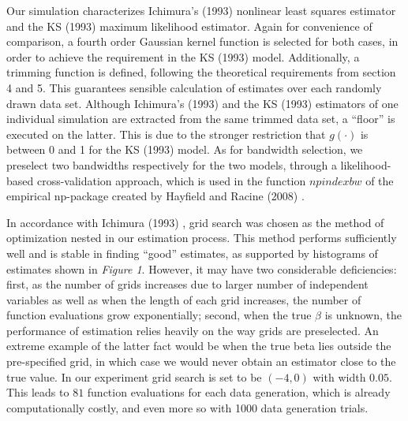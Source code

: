 Our simulation characterizes Ichimura's (1993) \cite{[6]} nonlinear least squares estimator and the KS (1993) \cite{[12]} maximum likelihood estimator. Again for convenience of comparison, a fourth order Gaussian kernel function is selected for both cases, in order to achieve the requirement in the KS (1993) \cite{[12]} model. Additionally, a trimming function is defined, following the theoretical requirements from section 4 and 5. This guarantees sensible calculation of estimates over each randomly drawn data set. Although Ichimura's (1993) \cite{[6]} and the KS (1993) \cite{[12]} estimators of one individual simulation are extracted from the same trimmed data set, a ``floor'' is executed on the latter. This is due to the stronger restriction that $g(\cdot)$ is between 0 and 1 for the KS (1993) \cite{[12]} model. As for bandwidth selection, we preselect two bandwidths respectively for the two models, through a likelihood-based cross-validation approach, which is used in the function $npindexbw$ of the empirical np-package created by Hayfield and Racine (2008) \cite{[28]}. 

In accordance with Ichimura (1993) \cite{[6]}, grid search was chosen as the method of optimization nested in our estimation process. This method performs sufficiently well and is stable in finding ``good'' estimates, as supported by histograms of estimates shown in \textit{Figure 1}. However, it may have two considerable deficiencies: first, as the number of grids increases due to larger number of independent variables as well as when the length of each grid increases, the number of function evaluations grow exponentially; second, when the true $\beta$ is unknown, the performance of estimation relies heavily on the way grids are preselected. An extreme example of the latter fact would be when the true beta lies outside the pre-specified grid, in which case we would never obtain an estimator close to the true value. In our experiment grid search is set to be $(-4,0)$ with width $0.05$. This leads to $81$ function evaluations for each data generation, which is already computationally costly, and even more so with 1000 data generation trials. 


